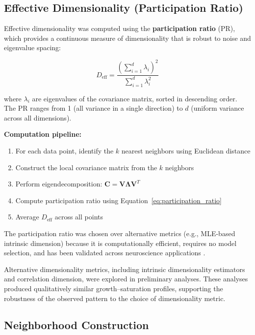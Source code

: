 \subsection{Effective Dimensionality (Participation Ratio)}

Effective dimensionality was computed using the \textbf{participation ratio} (PR), which provides a continuous measure of dimensionality that is robust to noise and eigenvalue spacing:

\begin{equation}
	D_{\mathrm{eff}} = \frac{\left(\sum_{i=1}^{d} \lambda_i\right)^2}{\sum_{i=1}^{d} \lambda_i^2}
	\label{eq:participation_ratio}
\end{equation}

where $\lambda_i$ are eigenvalues of the covariance matrix, sorted in descending order. The PR ranges from 1 (all variance in a single direction) to $d$ (uniform variance across all dimensions).

\textbf{Computation pipeline:}

\begin{enumerate}
	\item For each data point, identify the $k$ nearest neighbors using Euclidean distance
	\item Construct the local covariance matrix from the $k$ neighbors
	\item Perform eigendecomposition: $\mathbf{C} = \mathbf{V \Lambda V}^T$
	\item Compute participation ratio using Equation~\ref{eq:participation_ratio}
	\item Average $D_{\mathrm{eff}}$ across all points
\end{enumerate}

The participation ratio was chosen over alternative metrics (e.g., MLE-based intrinsic dimension) because it is computationally efficient, requires no model selection, and has been validated across neuroscience applications \citep{Kriegeskorte2013}.

Alternative dimensionality metrics, including intrinsic dimensionality estimators and correlation dimension, were explored in preliminary analyses. These analyses produced qualitatively similar growth--saturation profiles, supporting the robustness of the observed pattern to the choice of dimensionality metric.

\subsection{Neighborhood Construction}

